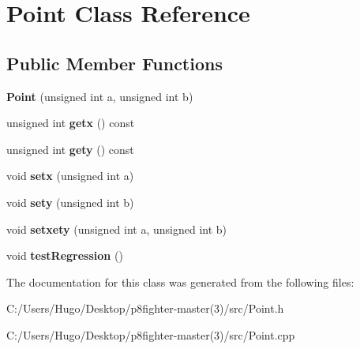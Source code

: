 \hypertarget{class_point}{}\section{Point Class Reference}
\label{class_point}
\subsection*{Public Member Functions}
\begin{DoxyCompactItemize}
\item 
\mbox{\label{class_point_a698ecb1fd3e41ef898717867df4b7fcb}} 
{\bfseries Point} (unsigned int a, unsigned int b)
\item 
\mbox{\label{class_point_a809889b3b62bcdbb2f37b45179b6eb03}} 
unsigned int {\bfseries getx} () const
\item 
\mbox{\label{class_point_affb474b8d9bb1da39e15d2ff4e1bc894}} 
unsigned int {\bfseries gety} () const
\item 
\mbox{\label{class_point_a210cc9e4c809a7a11f9dcb1afede8fe5}} 
void {\bfseries setx} (unsigned int a)
\item 
\mbox{\label{class_point_aab9ea9b111574e88767ea9fac59c949e}} 
void {\bfseries sety} (unsigned int b)
\item 
\mbox{\label{class_point_a1dea51500b88dd67f613d5f0d9cd217f}} 
void {\bfseries setxety} (unsigned int a, unsigned int b)
\item 
\mbox{\label{class_point_a7f80ed8cbad1279452629fdedef46e23}} 
void {\bfseries test\+Regression} ()
\end{DoxyCompactItemize}


The documentation for this class was generated from the following files\+:\begin{DoxyCompactItemize}
\item 
C\+:/\+Users/\+Hugo/\+Desktop/p8fighter-\/master(3)/src/Point.\+h\item 
C\+:/\+Users/\+Hugo/\+Desktop/p8fighter-\/master(3)/src/Point.\+cpp\end{DoxyCompactItemize}
